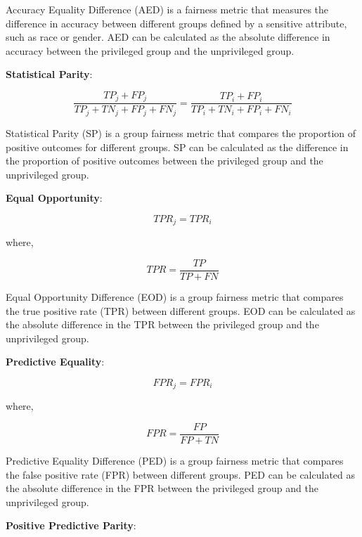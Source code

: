\documentclass[sn-vancouver]{sn-jnl}%
\theoremstyle{thmstyleone}%
\theoremstyle{thmstyletwo}%
\theoremstyle{thmstylethree}%
\begin{document}
Accuracy Equality Difference (AED) is a fairness metric that measures the difference in accuracy between different groups defined by a sensitive attribute, such as race or gender. AED can be calculated as the absolute difference in accuracy between the privileged group and the unprivileged group.

\textbf{Statistical Parity}:

\begin{equation}
\frac{TP_{j} + FP_{j}}{TP_{j} + TN_{j} + FP_{j} + FN_{j}} = \frac{TP_{i} + FP_{i}}{TP_{i} + TN_{i} + FP_{i} + FN_{i}} \label{eq4}
\end{equation}

Statistical Parity (SP) is a group fairness metric that compares the proportion of positive outcomes for different groups. SP can be calculated as the difference in the proportion of positive outcomes between the privileged group and the unprivileged group.

\textbf{Equal Opportunity}:

\begin{equation}
TPR_{j} = TPR_{i} \label{eq5}
\end{equation}

where,

\begin{equation}
TPR = \frac{TP}{TP + FN} \label{eq6}
\end{equation}

Equal Opportunity Difference (EOD) is a group fairness metric that compares the true positive rate (TPR) between different groups. EOD can be calculated as the absolute difference in the TPR between the privileged group and the unprivileged group.

\textbf{Predictive Equality}:

\begin{equation}
FPR_{j} = FPR_{i} \label{eq7}
\end{equation}

where,

\begin{equation}
FPR = \frac{FP}{FP + TN} \label{eq8}
\end{equation}

Predictive Equality Difference (PED) is a group fairness metric that compares the false positive rate (FPR) between different groups. PED can be calculated as the absolute difference in the FPR between the privileged group and the unprivileged group.

\textbf{Positive Predictive Parity}:
\end{document}
